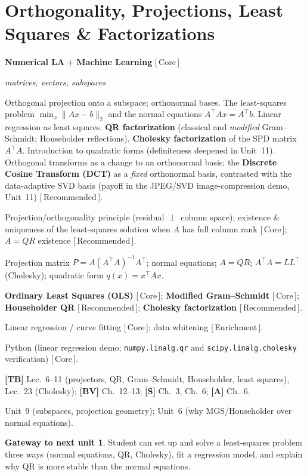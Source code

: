 \documentclass[11pt]{article}
\newcommand{\dom}[1]{{\sffamily\bfseries\color{RoyalBlue}#1}}
\newcommand{\pri}[1]{{\footnotesize\sffamily\color{BrickRed}[\,#1\,]}}
\newcommand{\obj}[1]{{\itshape #1}}
\newenvironment{unitfields}
  {\begin{description}[leftmargin=0pt,labelindent=0pt,style=nextline,
      font=\normalfont\sffamily\bfseries\color{RoyalBlue},itemsep=3pt,topsep=4pt]}
  {\end{description}}
\newcommand{\ff}[1]{\item[#1]}
\theoremstyle{definition}
\newtheorem*{gateway}{Gateway to next unit}
\begin{document}
\section{Orthogonality, Projections, Least Squares \& Factorizations}
\begin{unitfields}
\ff{Domain(s)} \dom{Numerical LA} + \dom{Machine Learning} \pri{Core}
\ff{Primary object(s)} \obj{matrices, vectors, subspaces}
\ff{Topics}
  Orthogonal projection onto a subspace; orthonormal bases. The least-squares
  problem $\min_x\|Ax-b\|_2$ and the normal equations $A^\top A x=A^\top b$.
  Linear regression as least squares. \textbf{QR factorization} (classical and
  \emph{modified} Gram--Schmidt; Householder reflections). \textbf{Cholesky
  factorization} of the SPD matrix $A^\top A$. Introduction to quadratic forms
  (definiteness deepened in Unit~11). Orthogonal transforms as a change to an
  orthonormal basis; the \textbf{Discrete Cosine Transform (DCT)} as a
  \emph{fixed} orthonormal basis, contrasted with the data-adaptive SVD basis
  (payoff in the JPEG/SVD image-compression demo, Unit~11) \pri{Recommended}.
\ff{Key theorems}
  Projection/orthogonality principle (residual $\perp$ column space);
  existence \& uniqueness of the least-squares solution when $A$ has full
  column rank \pri{Core}; $A=QR$ existence \pri{Recommended}.
\ff{Tools / formulas}
  Projection matrix $P=A(A^\top A)^{-1}A^\top$; normal equations;
  $A=QR$; $A^\top A=LL^\top$ (Cholesky); quadratic form $q(x)=x^\top Ax$.
\ff{Algorithms}
  \textbf{Ordinary Least Squares (OLS)} \pri{Core};
  \textbf{Modified Gram--Schmidt} \pri{Core};
  \textbf{Householder QR} \pri{Recommended};
  \textbf{Cholesky factorization} \pri{Recommended}.
\ff{Applications}
  Linear regression / curve fitting \pri{Core}; data whitening \pri{Enrichment}.
\ff{Languages}
  Python (linear regression demo; \texttt{numpy.linalg.qr} and
  \texttt{scipy.linalg.cholesky} verification) \pri{Core}.
\ff{Textbook refs}
  \textbf{[TB]} Lec.~6--11 (projectors, QR, Gram--Schmidt, Householder, least
  squares), Lec.~23 (Cholesky);
  \textbf{[BV]} Ch.~12--13; \textbf{[S]} Ch.~3, Ch.~6; \textbf{[A]} Ch.~6.
\ff{ENTER} Unit~9 (subspaces, projection geometry); Unit~6 (why MGS/Householder over normal equations).
\end{unitfields}
\begin{gateway}
Student can set up and solve a least-squares problem three ways (normal
equations, QR, Cholesky), fit a regression model, and explain why QR is more
stable than the normal equations.
\end{gateway}
\end{document}
